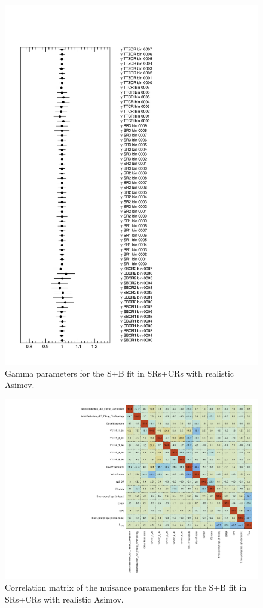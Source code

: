 \begin{figure}[htbp]
	\centering
	\includegraphics[width=.85\textwidth]{Chapters/CH8/figures/SPLUSB_CRSR_UsingDL1rcFullSys/Gammas}
	\caption{Gamma parameters for the S+B \tZc fit in SRs+CRs with realistic Asimov.}%
	\label{fig:stat:tzc:splusb:crsr:gamma}
\end{figure}

\begin{figure}[htbp]
	\centering
	\includegraphics[width=.95\textwidth]{Chapters/CH8/figures/SPLUSB_CRSR_UsingDL1rcFullSys/CorrMatrix}
	\caption{Correlation matrix of the nuisance paramenters for the S+B \tZc fit in SRs+CRs with realistic Asimov.}%
	\label{fig:stat:tzc:splusb:crsr:corrmatrix}
\end{figure}

